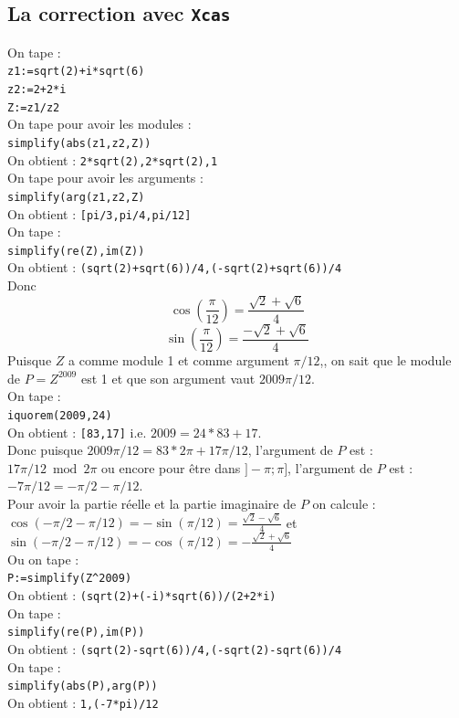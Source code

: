 \documentclass[a4paper,11pt]{book}
\begin{document}
\subsection{La correction avec {\tt Xcas}}
On tape :\\
{\tt z1:=sqrt(2)+i*sqrt(6)}\\
{\tt z2:=2+2*i}\\
{\tt Z:=z1/z2}\\
On tape pour avoir les modules :\\
{\tt simplify(abs(z1,z2,Z))}\\
On obtient : {\tt 2*sqrt(2),2*sqrt(2),1}\\ 
On tape  pour avoir les arguments :\\
{\tt simplify(arg(z1,z2,Z)}\\
On obtient : {\tt [pi/3,pi/4,pi/12]}\\ 
On tape :\\
{\tt simplify(re(Z),im(Z))}\\
On obtient : {\tt (sqrt(2)+sqrt(6))/4,(-sqrt(2)+sqrt(6))/4}\\ 
Donc  
$$\cos(\frac{\pi}{12})=\frac{\sqrt 2+\sqrt 6}{4}$$  
$$\sin(\frac{\pi}{12})=\frac{-\sqrt 2+\sqrt 6}{4}$$
Puisque $Z$ a comme module 1 et comme argument $\pi/12$,, on sait que le module
de $P=Z^{2009}$ est 1 et que son argument vaut $2009\pi/12$.\\
On tape :\\
{\tt iquorem(2009,24)}\\
On obtient : {\tt [83,17]} i.e. $2009=24*83+17$.\\
Donc puisque $2009\pi/12=83*2\pi+17\pi/12$, l'argument de $P$ est :\\
$17\pi/12 \bmod 2\pi$
ou encore pour \^etre dans $]-\pi;\pi]$,
l'argument de $P$ est :\\
$-7\pi/12=-\pi/2-\pi/12$.\\
Pour avoir la partie r\'eelle et la partie imaginaire de $P$ on calcule :\\
$\cos(-\pi/2-\pi/12)=-\sin(\pi/12)=\displaystyle \frac{\sqrt 2-\sqrt 6}{4}$ et\\
$\sin(-\pi/2-\pi/12)=-\cos(\pi/12)=\displaystyle-\frac{\sqrt 2+\sqrt 6}{4}$\\
Ou on tape :\\
{\tt P:=simplify(Z\verb|^|2009)}\\
On obtient : {\tt (sqrt(2)+(-i)*sqrt(6))/(2+2*i)}\\ 
On tape :\\
{\tt simplify(re(P),im(P))}\\
On obtient : {\tt (sqrt(2)-sqrt(6))/4,(-sqrt(2)-sqrt(6))/4}\\ 
On tape :\\
{\tt simplify(abs(P),arg(P))}\\
On obtient : {\tt 1,(-7*pi)/12}\\ 
\end{document}
